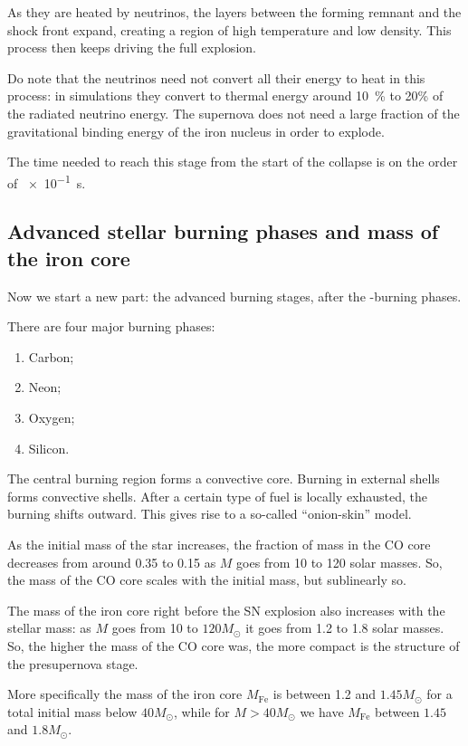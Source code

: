 \documentclass[main.tex]{subfiles}
\begin{document}
As they are heated by neutrinos, the layers between the forming remnant and the shock front expand, creating a region of high temperature and low density.
This process then keeps driving the full explosion.

Do note that the neutrinos need not convert all their energy to heat in this process: in simulations they convert to thermal energy around \SI{10}{\%} to \num{20}{\%} of the radiated neutrino energy.
The supernova does not need a large fraction of the gravitational binding energy of the iron nucleus in order to explode.

The time needed to reach this stage from the start of the collapse is on the order of \SI{e-1}{s}.

\subsection{Advanced stellar burning phases and mass of the iron core}

Now we start a new part: the advanced burning stages, after the -burning phases. 

There are four major burning phases: 
%
\begin{enumerate}
    \item Carbon;
    \item Neon;
    \item Oxygen;
    \item Silicon.
\end{enumerate}

The central burning region forms a convective core.
Burning in external shells forms convective shells.
After a certain type of fuel is locally exhausted, the burning shifts outward.
This gives rise to a so-called ``onion-skin'' model.

As the initial mass of the star increases, the fraction of mass in the CO core decreases from around \num{.35} to \num{.15} as \(M\) goes from 10 to 120 solar masses.  
So, the mass of the CO core scales with the initial mass, but sublinearly so.

The mass of the iron core right before the SN explosion also increases with the stellar mass: as \(M\) goes from 10 to \(120 M_{\odot}\) it goes from 1.2 to 1.8 solar masses. 
So, the higher the mass of the CO core was, the more compact is the structure of the presupernova stage.

More specifically the mass of the iron core \(M _{\text{Fe}}\) is between \num{1.2} and \(\num{1.45}M_{\odot}\) for a total initial mass below \(40 M_{\odot}\), while for \(M > 40 M_{\odot}\) we have \(M _{\text{Fe}}\) between \(\num{1.45}\) and \(1.8 M_{\odot}\).
\end{document}

